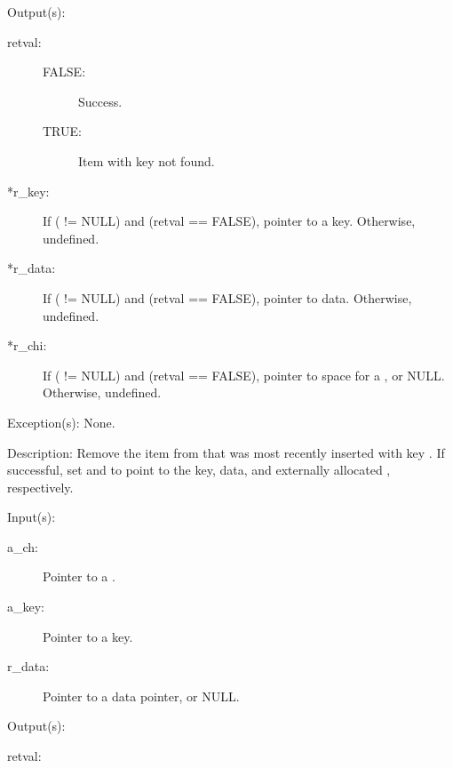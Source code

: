 \begin{capi}
\begin{capilist}
\begin{description}
		\end{description}
	\item[Output(s): ]
		\begin{description}\item[]
		\item[retval: ]
			\begin{description}\item[]
			\item[FALSE: ]
				Success.
			\item[TRUE: ]
				Item with key  not	found.
			\end{description}
		\item[*r\_key: ]
			If ( != NULL) and (retval == FALSE),
			pointer to a key.  Otherwise, undefined.
		\item[*r\_data: ]
			If ( != NULL) and (retval == FALSE),
			pointer to data.  Otherwise, undefined.
		\item[*r\_chi: ]
			If ( != NULL) and (retval == FALSE),
			pointer to space for a , or NULL.
			Otherwise, undefined.
		\end{description}
	\item[Exception(s): ] None.
	\item[Description: ]
		Remove the item from  that was most recently
		inserted with key .  If successful, set
		 and  to point to the key, data,
		and externally allocated , respectively.
	\end{capilist}
\label{ch_search}
	\begin{capilist}
	\item[Input(s): ]
		\begin{description}\item[]
		\item[a\_ch: ]
			Pointer to a .
		\item[a\_key: ]
			Pointer to a key.
		\item[r\_data: ]
			Pointer to a data pointer, or NULL.
		\end{description}
	\item[Output(s): ]
		\begin{description}\item[]
		\item[retval: ]
			\begin{description}\item[]

\end{description}
\end{description}
\end{capilist}
\end{capi}
